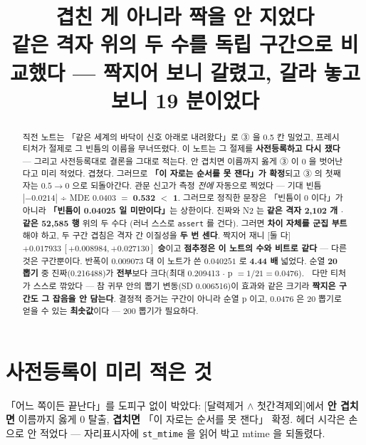 \documentclass{article}
\title{겹친 게 아니라 짝을 안 지었다 \\
  {\large 같은 격자 위의 두 수를 독립 구간으로 비교했다 --- 짝지어 보니 갈렸고, 갈라 놓고 보니 19 분이었다}}
\begin{document}
\maketitle

\begin{abstract}
직전 노트는 「같은 세계의 바닥이 신호 아래로 내려왔다」로 ③ 을 0.5 칸 밀었고,
프레시 티처가 절제로 그 빈틈의 이름을 무너뜨렸다.
이 노트는 그 절제를 \textbf{사전등록하고 다시 쟀다} --- 그리고 사전등록대로 결론을 그대로 적는다.
{안 겹치면 이름까지 옳게 ③ 이 0 을 벗어난다고 미리 적었다. 겹쳤다.
그러므로 \textbf{「이 자로는 순서를 못 잰다」가 확정}되고 ③ 의 첫째 자는 $0.5 \to 0$ 으로 되돌아간다.}
{관문 신고가 측정 \emph{전에} 자동으로 찍었다 --- 기대 빈틈 $|-0.0214|$ ÷ MDE $0.0403$ $=$ \textbf{0.532 $<$ 1}.
그러므로 정직한 문장은 「빈틈이 0 이다」가 아니라 \textbf{「빈틈이 0.04025 일 미만이다」}는 상한이다.}
{진짜와 N2 는 \textbf{같은 격자 2{,}102 개 $\cdot$ 같은 52{,}585 행} 위의 두 수다
(러너 스스로 \texttt{assert} 를 건다). 그러면 \textbf{차이 자체를 군집 부트} 해야 하고,
두 구간 겹침은 격자 간 이질성을 \textbf{두 번 센다}.
짝지어 재니 [둘 다] $+0.017933\,[+0.008984, +0.027130]$ \textbf{승}이고
\textbf{점추정은 이 노트의 수와 비트로 같다} --- 다른 것은 구간뿐이다.
반폭이 $0.009073$ 대 이 노트가 쓴 $0.040251$ 로 \textbf{4.44 배} 넓었다.}
{순열 \textbf{20 뽑기} 중 진짜(0.216488)가 \textbf{전부}보다 크다(최대 0.209413 $\cdot$ p $=1/21=0.0476$).
🔴 다만 티처가 스스로 깎았다 --- 참 귀무 안의 뽑기 변동(SD 0.006516)이 효과와 같은 크기라
\textbf{짝지은 구간도 그 잡음을 안 담는다}. 결정적 증거는 구간이 아니라 순열 p 이고,
0.0476 은 20 뽑기로 얻을 수 있는 \textbf{최솟값}이다 --- 200 뽑기가 필요하다.}
\end{abstract}

\section{사전등록이 미리 적은 것}

「어느 쪽이든 끝난다」를 도피구 없이 박았다:
[달력제거 $\wedge$ 첫간격제외]에서 \textbf{안 겹치면} 이름까지 옳게 0 탈출,
\textbf{겹치면} 「이 자로는 순서를 못 잰다」 확정.
헤더 시각은 손으로 안 적었다 --- 자리표시자에 \texttt{st\_mtime} 을 읽어 박고 mtime 을 되돌렸다.
\end{document}
